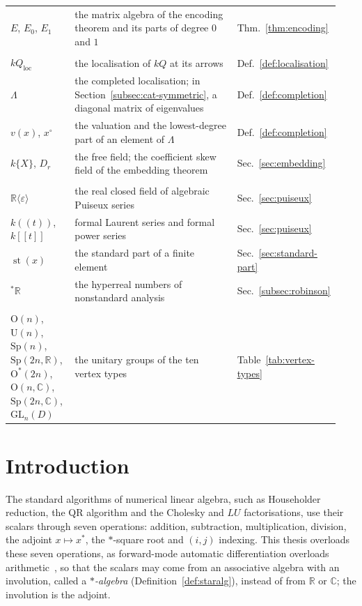 \documentclass[12pt, a4paper]{report}
\theoremstyle{plain}
\theoremstyle{definition}
\theoremstyle{remark}
\theoremstyle{plain}
\newcommand{\staralg}[0]{$*$-algebra}
\newcommand{\RR}{\mathbb{R}}
\newcommand{\CC}{\mathbb{C}}
\newcommand{\GL}{\mathrm{GL}}
\newcommand{\Or}{\mathrm{O}}
\newcommand{\Un}{\mathrm{U}}
\newcommand{\Sp}{\mathrm{Sp}}
\newcommand{\st}{\operatorname{st}}
\begin{document}
\begin{singlespace}
{\begin{longtable}{@{}>{\raggedright\arraybackslash}p{0.2\linewidth}>{\raggedright\arraybackslash}p{0.56\linewidth}>{\raggedright\arraybackslash}p{0.18\linewidth}@{}}
$E$, $E_0$, $E_1$ & the matrix algebra of the encoding theorem and its parts of degree $0$ and $1$ & Thm.~\ref{thm:encoding} \\
\addlinespace
\multicolumn{3}{@{}l}{\emph{Localisation and completion}} \\
$kQ_{\mathrm{loc}}$ & the localisation of $kQ$ at its arrows & Def.~\ref{def:localisation} \\
$\Lambda$ & the completed localisation; in Section~\ref{subsec:cat-symmetric}, a diagonal matrix of eigenvalues & Def.~\ref{def:completion} \\
$v(x)$, $x^\circ$ & the valuation and the lowest-degree part of an element of $\Lambda$ & Def.~\ref{def:completion} \\
$k\{X\}$, $D_r$ & the free field; the coefficient skew field of the embedding theorem & Sec.~\ref{sec:embedding} \\
\addlinespace
\multicolumn{3}{@{}l}{\emph{Infinitesimals}} \\
$\RR\langle\varepsilon\rangle$ & the real closed field of algebraic Puiseux series & Sec.~\ref{sec:puiseux} \\
$k((t))$, $k[[t]]$ & formal Laurent series and formal power series & Sec.~\ref{sec:puiseux} \\
$\st(x)$ & the standard part of a finite element & Sec.~\ref{sec:standard-part} \\
${}^*\RR$ & the hyperreal numbers of nonstandard analysis & Sec.~\ref{subsec:robinson} \\
\addlinespace
\multicolumn{3}{@{}l}{\emph{Groups}} \\
$\Or(n)$, $\Un(n)$, $\Sp(n)$, $\Sp(2n,\RR)$, $\Or^*(2n)$, $\Or(n,\CC)$, $\Sp(2n,\CC)$, $\GL_n(D)$ & the unitary groups of the ten vertex types & Table~\ref{tab:vertex-types} \\
\bottomrule
\end{longtable}
}
\end{singlespace}
\cleardoublepage
\chapter{Introduction}
\label{chap:intro}

The standard algorithms of numerical linear algebra, such as Householder reduction, the QR algorithm and the Cholesky and $LU$ factorisations, use their scalars through seven operations: addition, subtraction, multiplication, division, the adjoint $x\mapsto x^*$, the $*$-square root and $(i,j)$ indexing. This thesis overloads these seven operations, as forward-mode automatic differentiation overloads arithmetic~\cite{GriewankWalther2008}, so that the scalars may come from an associative algebra with an involution, called a \emph{\staralg} (Definition~\ref{def:staralg}), instead of from $\RR$ or $\CC$; the involution is the adjoint.
\end{document}
